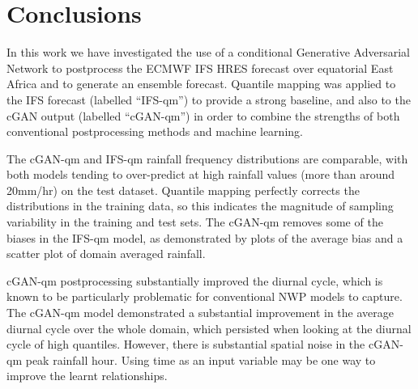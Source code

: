 \documentclass{article}
\begin{document}


\section{Conclusions}


In this work we have investigated the use of a conditional Generative Adversarial Network to postprocess the ECMWF IFS HRES forecast over equatorial East Africa and to generate an ensemble forecast. Quantile mapping was applied to the IFS forecast (labelled ``IFS-qm'') to provide a strong baseline, and also to the cGAN output (labelled ``cGAN-qm'') in order to combine the strengths of both conventional postprocessing methods and machine learning.

The cGAN-qm and IFS-qm rainfall frequency distributions are comparable, with both models tending to over-predict at high rainfall values (more than around 20mm/hr) on the test dataset. Quantile mapping perfectly corrects the distributions in the training data, so this indicates the magnitude of sampling variability in the training and test sets. The cGAN-qm removes some of the biases in the IFS-qm model, as demonstrated by plots of the average bias and a scatter plot of domain averaged rainfall.

cGAN-qm postprocessing substantially improved the diurnal cycle, which is known to be particularly problematic for conventional NWP models to capture. The cGAN-qm model demonstrated a substantial improvement in the average diurnal cycle over the whole domain, which persisted when looking at the diurnal cycle of high quantiles. However, there is substantial spatial noise in the cGAN-qm peak rainfall hour. Using time as an input variable may be one way to improve the learnt relationships.
\end{document}
